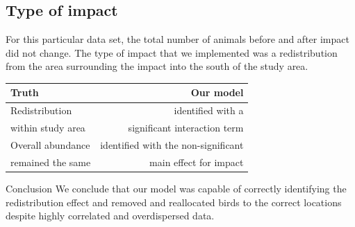 \documentclass[11pt, a4paper]{article}
\begin{document}
\subsection{Type of impact}
For this particular data set, the total number of animals before and after impact did not change. The type of impact that we implemented was a redistribution from the area surrounding the impact into the south of the study area. 
\begin{table}[ht!]
\begin{tabular}{l|r}
\textbf{Truth} & \textbf{Our model}\\
\hline
Redistribution  & identified with a \\
within study area & significant interaction term\\
\hline
Overall abundance  & identified with the non-significant \\
remained the same & main effect for impact\\
\end{tabular}
\end{table}
\begin{block}{Conclusion}
We conclude that our model was capable of correctly identifying the redistribution effect and removed and reallocated birds to the correct locations despite highly correlated and overdispersed data. \\
\end{block}
\end{document}

